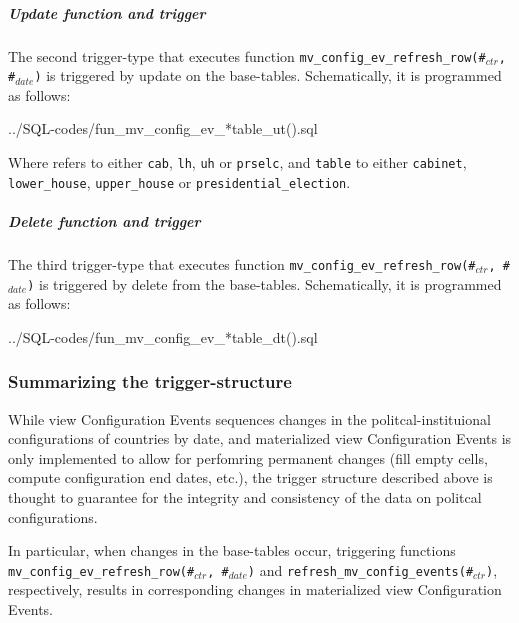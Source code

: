 \subparagraph{Update function and trigger}
The second trigger-type that executes function \texttt{\footnotesize mv\_config\_ev\_refresh\_row(\#$_{ctr}$, \#$_{date}$)} is triggered by update on the base-tables.
Schematically, it is programmed as follows: 

%
{../SQL-codes/fun_mv_config_ev_*table_ut().sql}

Where \texttt{\footnotesize *} refers to either \texttt{\footnotesize cab}, \texttt{\footnotesize lh}, \texttt{\footnotesize uh} or \texttt{\footnotesize prselc}, and \texttt{\footnotesize *table} to either \texttt{\footnotesize cabinet}, \texttt{\footnotesize lower\_house}, \texttt{\footnotesize upper\_house} or \texttt{\footnotesize presidential\_election}.

 
\subparagraph{Delete function and trigger}
The third trigger-type that executes function \texttt{\footnotesize mv\_config\_ev\_refresh\_row(\#$_{ctr}$, \#$_{date}$)} is triggered by delete from the base-tables.
Schematically, it is programmed as follows: 

%
{../SQL-codes/fun_mv_config_ev_*table_dt().sql}

\subsubsection{Summarizing the trigger-structure}
While view Configuration Events sequences changes in the politcal-instituional configurations of countries by date, and materialized view Configuration Events is only implemented to allow for perfomring permanent changes (fill empty cells, compute configuration end dates, etc.), the trigger structure described above is thought to guarantee for the integrity and consistency of the data on politcal configurations.

In particular, when changes in the base-tables occur, triggering functions \texttt{\footnotesize mv\_config\_ev\_refresh\_row(\#$_{ctr}$, \#$_{date}$)} and \texttt{\footnotesize refresh\_mv\_config\_events(\#$_{ctr}$)}, respectively, results in corresponding changes in materialized view Configuration Events.

